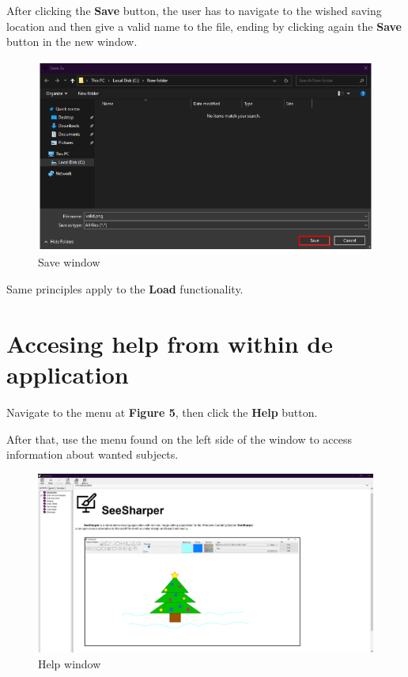 \documentclass[12pt]{article}
\begin{document}
After clicking the \textbf{Save} button, the user has to navigate to the wished saving location and then give a valid name to the file, ending by clicking again the \textbf{Save} button in the new window.

\begin{figure}[h]
\centering
\includegraphics[width=11.5cm]{graphics/save.png}
\caption{Save window}
\end{figure}

Same principles apply to the \textbf{Load} functionality.

\section*{Accesing help from within de application}

Navigate to the menu at \textbf{Figure 5}, then click the \textbf{Help} button.

After that, use the menu found on the left side of the window to access information about wanted subjects.

\begin{figure}[h]
\centering
\includegraphics[width=13.5cm]{graphics/help.png}
\caption{Help window}
\end{figure}
\end{document}
